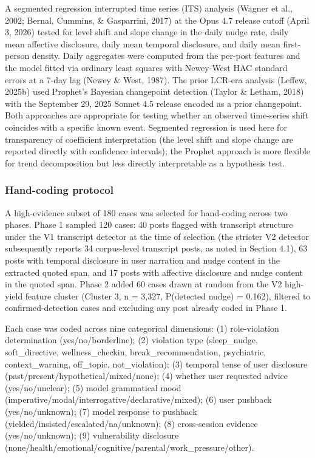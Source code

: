 \documentclass[11pt]{article}
\begin{document}
A segmented regression interrupted time series (ITS) analysis (Wagner et al., 2002; Bernal, Cummins, \& Gasparrini, 2017) at the Opus 4.7 release cutoff (April 3, 2026) tested for level shift and slope change in the daily nudge rate, daily mean affective disclosure, daily mean temporal disclosure, and daily mean first-person density. Daily aggregates were computed from the per-post features and the model fitted via ordinary least squares with Newey-West HAC standard errors at a 7-day lag (Newey \& West, 1987). The prior LCR-era analysis (Leffew, 2025b) used Prophet's Bayesian changepoint detection (Taylor \& Letham, 2018) with the September 29, 2025 Sonnet 4.5 release encoded as a prior changepoint. Both approaches are appropriate for testing whether an observed time-series shift coincides with a specific known event. Segmented regression is used here for transparency of coefficient interpretation (the level shift and slope change are reported directly with confidence intervals); the Prophet approach is more flexible for trend decomposition but less directly interpretable as a hypothesis test.

\subsubsection{Hand-coding protocol}

A high-evidence subset of 180 cases was selected for hand-coding across two phases. Phase 1 sampled 120 cases: 40 posts flagged with transcript structure under the V1 transcript detector at the time of selection (the stricter V2 detector subsequently reports 34 corpus-level transcript posts, as noted in Section 4.1), 63 posts with temporal disclosure in user narration and nudge content in the extracted quoted span, and 17 posts with affective disclosure and nudge content in the quoted span. Phase 2 added 60 cases drawn at random from the V2 high-yield feature cluster (Cluster 3, n = 3,327, P(detected nudge) = 0.162), filtered to confirmed-detection cases and excluding any post already coded in Phase 1.

Each case was coded across nine categorical dimensions: (1) role-violation determination (yes/no/borderline); (2) violation type (sleep\_nudge, soft\_directive, wellness\_checkin, break\_recommendation, psychiatric, context\_warning, off\_topic, not\_violation); (3) temporal tense of user disclosure (past/present/hypothetical/mixed/none); (4) whether user requested advice (yes/no/unclear); (5) model grammatical mood (imperative/modal/interrogative/declarative/mixed); (6) user pushback (yes/no/unknown); (7) model response to pushback (yielded/insisted/escalated/na/unknown); (8) cross-session evidence (yes/no/unknown); (9) vulnerability disclosure (none/health/emotional/cognitive/parental/work\_pressure/other).
\end{document}
